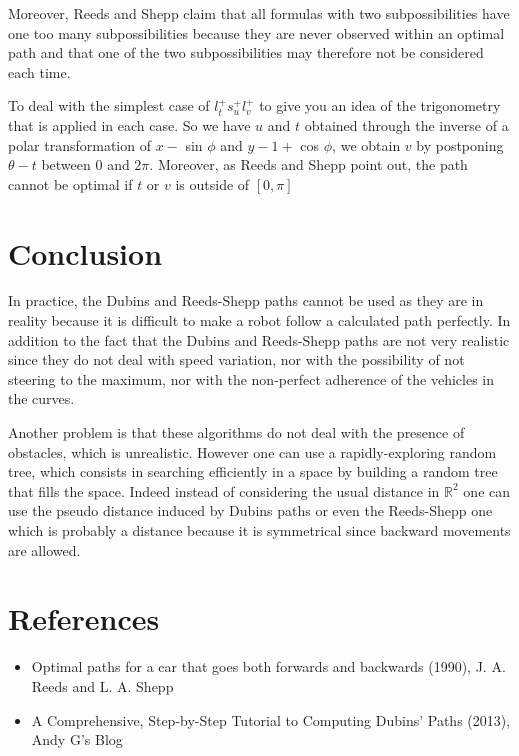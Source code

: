 \documentclass[11pt,a4paper]{article}
\begin{document}
	Moreover, Reeds and Shepp claim that all formulas with two subpossibilities have one too many subpossibilities because they are never observed within an optimal path and that one of the two subpossibilities may therefore not be considered each time. %
	
	To deal with the simplest case of $l_t^+s_u^+l_v^+$ to give you an idea of the trigonometry that is applied in each case. So we have $u$ and $t$ obtained through the inverse of a polar transformation of $x -$ sin $\phi$ and $y - 1 +$ cos $\phi$, we obtain $v$ by postponing $\theta - t$ between 0 and $2\pi$. Moreover, as Reeds and Shepp point out, the path cannot be optimal if $t$ or $v$ is outside of $[0, \pi]$
	
	\section{Conclusion}
	
	In practice, the Dubins and Reeds-Shepp paths cannot be used as they are in reality because it is difficult to make a robot follow a calculated path perfectly. In addition to the fact that the Dubins and Reeds-Shepp paths are not very realistic since they do not deal with speed variation, nor with the possibility of not steering to the maximum, nor with the non-perfect adherence of the vehicles in the curves.
	
	Another problem is that these algorithms do not deal with the presence of obstacles, which is unrealistic. However one can use a rapidly-exploring random tree, which consists in searching efficiently in a space by building a random tree that fills the space. Indeed instead of considering the usual distance in $\mathbb{R}^2$ one can use the pseudo distance induced by Dubins paths or even the Reeds-Shepp one which is probably a distance because it is symmetrical since backward movements are allowed.
	
	\section{References}
	
	\begin{itemize}
		\item Optimal paths for a car that goes both forwards and backwards (1990), J. A. Reeds and L. A. Shepp
		\item A Comprehensive, Step-by-Step Tutorial to Computing Dubins' Paths (2013), Andy G's Blog
	\end{itemize}
\end{document}
